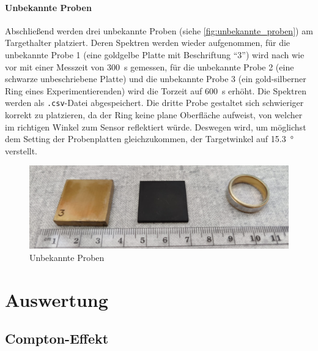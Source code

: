 \documentclass[ngerman]{scrartcl}
\begin{document}
\paragraph{Unbekannte Proben}
Abschließend werden drei unbekannte Proben (siehe \autoref{fig:unbekannte_proben}) am Targethalter platziert. Deren Spektren werden wieder aufgenommen, für die unbekannte Probe 1 (eine goldgelbe Platte mit Beschriftung \enquote{3}) wird nach wie vor mit einer Messzeit von \SI{300}{s} gemessen, für die unbekannte Probe 2 (eine schwarze unbeschriebene Platte) und die unbekannte Probe 3 (ein gold-silberner Ring eines Experimentierenden) wird die Torzeit auf \SI{600}{s} erhöht. Die Spektren werden als \texttt{.csv}-Datei abgespeichert. Die dritte Probe gestaltet sich schwieriger korrekt zu platzieren, da der Ring keine plane Oberfläche aufweist, von welcher im richtigen Winkel zum Sensor reflektiert würde. Deswegen wird, um möglichst dem Setting der Probenplatten gleichzukommen, der Targetwinkel auf \SI{15.3}{\degree} verstellt.
%
\begin{figure}[H]
    \centering
    \begin{samepage}
        \includegraphics[width=\linewidth]{fig/unbekannt.png}
        \caption{Unbekannte Proben}
        \label{fig:unbekannte_proben}
    \end{samepage}
\end{figure}



\section{Auswertung}
\label{sec:auswertung}

\subsection{Compton-Effekt}
\label{subsec:auswertung_compton}
\end{document}
